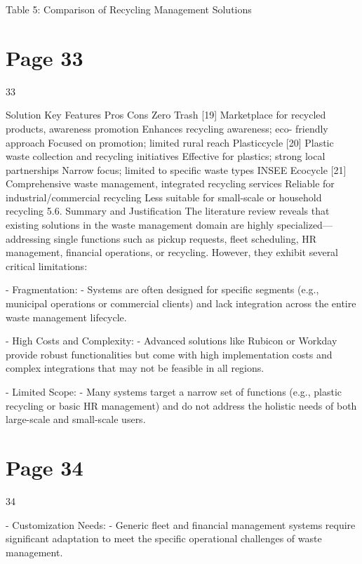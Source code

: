 \documentclass{article}
\begin{document}
Table 5: Comparison of Recycling Management Solutions 
 

\section*{Page 33}
   
 
 33  
 
Solution Key Features Pros Cons 
Zero Trash [19] Marketplace for 
recycled products, 
awareness 
promotion 
Enhances recycling 
awareness; eco-
friendly approach 
Focused on 
promotion; limited 
rural reach 
Plasticcycle [20] Plastic waste 
collection and 
recycling initiatives 
Effective for plastics; 
strong local 
partnerships 
Narrow focus; 
limited to specific 
waste types 
INSEE Ecocycle [21] Comprehensive 
waste management, 
integrated recycling 
services 
Reliable for 
industrial/commercial 
recycling 
Less suitable for 
small-scale or 
household recycling 
5.6. Summary and Justification 
The literature review reveals that existing solutions in the waste management domain are 
highly specialized—addressing single functions such as pickup requests, fleet scheduling, HR 
management, financial operations, or recycling. However, they exhibit several critical 
limitations: 
 
- Fragmentation:   
  - Systems are often designed for specific segments (e.g., municipal operations or commercial 
clients) and lack integration across the entire waste management lifecycle. 
 
- High Costs and Complexity:   
  - Advanced solutions like Rubicon or Workday provide robust functionalities but come with 
high implementation costs and complex integrations that may not be feasible in all regions. 
 
- Limited Scope:   
  - Many systems target a narrow set of functions (e.g., plastic recycling or basic HR 
management) and do not address the holistic needs of both large-scale and small-scale users. 

\section*{Page 34}
   
 
 34  
 
 
- Customization Needs:   
  - Generic fleet and financial management systems require significant adaptation to meet the 
specific operational challenges of waste management. 
 
\end{document}
